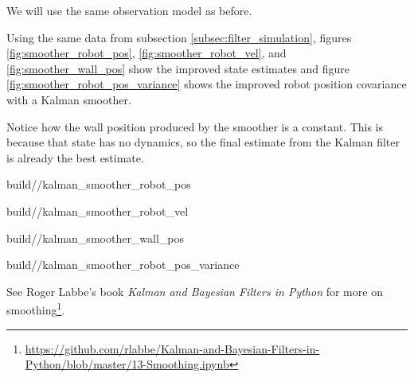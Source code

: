 We will use the same observation model as before.

Using the same data from subsection \ref{subsec:filter_simulation}, figures
\ref{fig:smoother_robot_pos}, \ref{fig:smoother_robot_vel}, and
\ref{fig:smoother_wall_pos} show the improved \gls{state} estimates and figure
\ref{fig:smoother_robot_pos_variance} shows the improved robot position
covariance with a Kalman smoother.

Notice how the wall position produced by the smoother is a constant. This is
because that \gls{state} has no dynamics, so the final estimate from the Kalman
filter is already the best estimate.
\begin{svg}{build/\chapterpath/kalman_smoother_robot_pos}
  \caption{Robot position with Kalman smoother}
  \label{fig:smoother_robot_pos}
\end{svg}
\begin{svg}{build/\chapterpath/kalman_smoother_robot_vel}
  \caption{Robot velocity with Kalman smoother}
  \label{fig:smoother_robot_vel}
\end{svg}
\begin{svg}{build/\chapterpath/kalman_smoother_wall_pos}
  \caption{Wall position with Kalman smoother}
  \label{fig:smoother_wall_pos}
\end{svg}
\begin{svg}{build/\chapterpath/kalman_smoother_robot_pos_variance}
  \caption{Robot position variance with Kalman smoother}
  \label{fig:smoother_robot_pos_variance}
\end{svg}

See Roger Labbe's book \textit{Kalman and Bayesian Filters in Python} for more
on
smoothing\footnote{\url{https://github.com/rlabbe/Kalman-and-Bayesian-Filters-in-Python/blob/master/13-Smoothing.ipynb}}.

